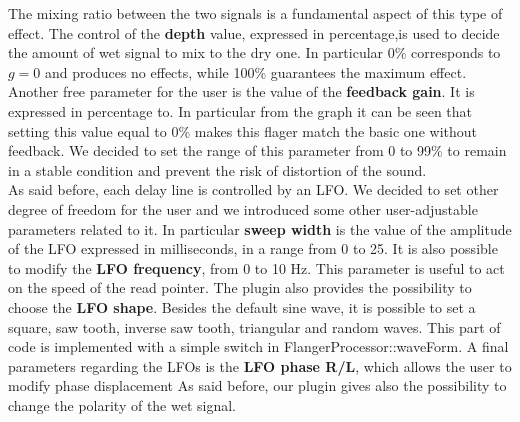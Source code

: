 The mixing ratio between the two signals is a fundamental aspect of this type of effect. The control of the \textbf{depth} value, expressed in percentage,is used to decide the amount of wet signal to mix to the dry one. In particular 0\% corresponds to $g=0$ and produces no effects, while 100\% guarantees the maximum effect.\\
Another free parameter for the user is the value of the \textbf{feedback gain}. It is expressed in percentage to. In particular from the graph it can be seen that setting this value equal to 0\% makes this flager match the basic one without feedback. We decided to set the range of this parameter from 0 to 99\% to remain in a stable condition and prevent the risk of distortion of the sound.\\
As said before, each delay line is controlled by an LFO. We decided to set other degree of freedom for the user and we introduced some other user-adjustable parameters related to it. In particular \textbf{sweep width} is the value of the amplitude of the LFO expressed in milliseconds, in a range from  0 to 25. It is also possible to modify the \textbf{LFO frequency}, from 0 to 10 Hz. This parameter is useful to act on the speed of the read pointer. The plugin also provides the possibility to choose the \textbf{LFO shape}. Besides the default sine wave, it is possible to set a square, saw tooth, inverse saw tooth, triangular and random waves. This part of code is implemented with a simple switch in FlangerProcessor::waveForm. A final parameters regarding the LFOs is the \textbf{LFO phase R/L}, which allows the user to modify 
phase displacement
As said before, our plugin gives also the possibility to change the polarity of the wet signal. 



